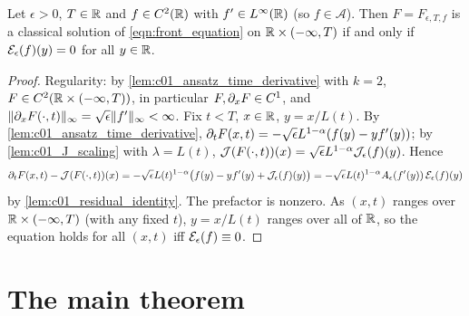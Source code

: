 \begin{lemma}
  \label{lem:self_similar_reduction}
  Let $\epsilon>0$, $T\in\mathbb{R}$ and $f\in C^2(\mathbb{R})$ with $f'\in L^\infty(\mathbb{R})$ (so $f\in\mathcal A$).
  Then $F=F_{\epsilon,T,f}$ is a classical solution of \eqref{eqn:front_equation} on
  $\mathbb{R}\times(-\infty,T)$ if and only if $\mathcal{E}_\epsilon(f)(y)=0$ for all $y\in\mathbb{R}$.
\end{lemma}
\begin{proof}
  Regularity: by \cref{lem:c01_ansatz_time_derivative} with $k=2$, $F\in C^2(\mathbb{R}\times(-\infty,T))$,
  in particular $F,\partial_xF\in C^1$, and $\|\partial_xF(\cdot,t)\|_\infty=\sqrt\epsilon\|f'\|_\infty<\infty$.
  Fix $t<T$, $x\in\mathbb{R}$, $y=x/L(t)$.  By \cref{lem:c01_ansatz_time_derivative},
  $\partial_tF(x,t)=-\sqrt\epsilon L^{1-\alpha}(f(y)-yf'(y))$; by \cref{lem:c01_J_scaling} with
  $\lambda=L(t)$, $\mathcal{J}(F(\cdot,t))(x)=\sqrt\epsilon L^{1-\alpha}\mathcal{J}_\epsilon(f)(y)$.  Hence
  \[
    \partial_tF(x,t)-\mathcal{J}(F(\cdot,t))(x)=-\sqrt\epsilon L(t)^{1-\alpha}\bigl(f(y)-yf'(y)+\mathcal{J}_\epsilon(f)(y)\bigr)
    =-\sqrt\epsilon L(t)^{1-\alpha}A_\epsilon(f'(y))\,\mathcal{E}_\epsilon(f)(y)
  \]
  by \cref{lem:c01_residual_identity}.  The prefactor is nonzero.  As $(x,t)$ ranges over
  $\mathbb{R}\times(-\infty,T)$ (with any fixed $t$), $y=x/L(t)$ ranges over all of $\mathbb{R}$, so the
  equation holds for all $(x,t)$ iff $\mathcal{E}_\epsilon(f)\equiv0$.
\end{proof}

\section{The main theorem}

